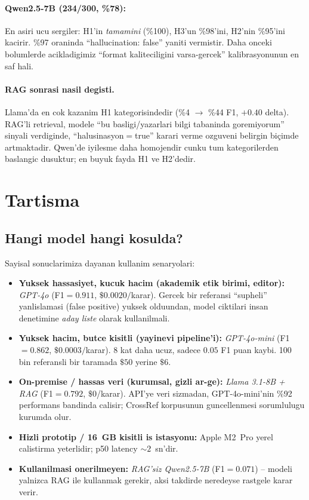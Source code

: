 \documentclass[11pt,a4paper]{article}
\begin{document}
\paragraph{Qwen2.5-7B (234/300, \%78):} En asiri ucu sergiler: H1'in
\emph{tamamini} (\%100), H3'un \%98'ini, H2'nin \%95'ini kacirir. \%97
oraninda ``hallucination: false'' yaniti vermistir. Daha onceki bolumlerde
acikladigimiz ``format kaliteciligini varsa-gercek'' kalibrasyonunun en
saf hali.

\paragraph{RAG sonrasi nasil degisti.} Llama'da en cok kazanim H1
kategorisindedir (\%4 $\to$ \%44 F1, $+\!0.40$ delta). RAG'li retrieval,
modele ``bu basligi/yazarlari bilgi tabaninda goremiyorum'' sinyali verdiginde,
``halusinasyon$=$true'' karari verme ozguveni belirgin biçimde artmaktadir.
Qwen'de iyilesme daha homojendir cunku tum kategorilerden baslangic dusuktur;
en buyuk fayda H1 ve H2'dedir.

\section{Tartisma}
\label{sec:tartisma}

\subsection{Hangi model hangi kosulda?}
Sayisal sonuclarimiza dayanan kullanim senaryolari:
\begin{itemize}[nosep]
\item \textbf{Yuksek hassasiyet, kucuk hacim (akademik etik birimi,
editor):} \emph{GPT-4o} (F1$=0.911$, $\$0.0020/$karar). Gercek bir
referansi ``supheli'' yanlislamasi (false positive) yuksek olduundan, model
ciktilari insan denetimine \emph{aday liste} olarak kullanilmali.
\item \textbf{Yuksek hacim, butce kisitli (yayinevi pipeline'i):}
\emph{GPT-4o-mini} (F1$=0.862$, $\$0.0003/$karar). 8 kat daha ucuz, sadece
$0.05$ F1 puan kaybi. 100 bin referansli bir taramada $\$50$ yerine $\$6$.
\item \textbf{On-premise / hassas veri (kurumsal, gizli ar-ge):}
\emph{Llama 3.1-8B + RAG} (F1$=0.792$, $\$0$/karar). API'ye veri
sizmadan, GPT-4o-mini'nin \%92 performans bandinda calisir; CrossRef
korpusunun guncellenmesi sorumlulugu kurumda olur.
\item \textbf{Hizli prototip / 16~GB kisitli is istasyonu:} Apple M2~Pro
yerel calistirma yeterlidir; p50 latency $\sim 2$~sn'dir.
\item \textbf{Kullanilmasi onerilmeyen:} \emph{RAG'siz Qwen2.5-7B}
(F1$=0.071$) -- modeli yalnizca RAG ile kullanmak gerekir, aksi takdirde
neredeyse rastgele karar verir.
\end{itemize}
\end{document}
